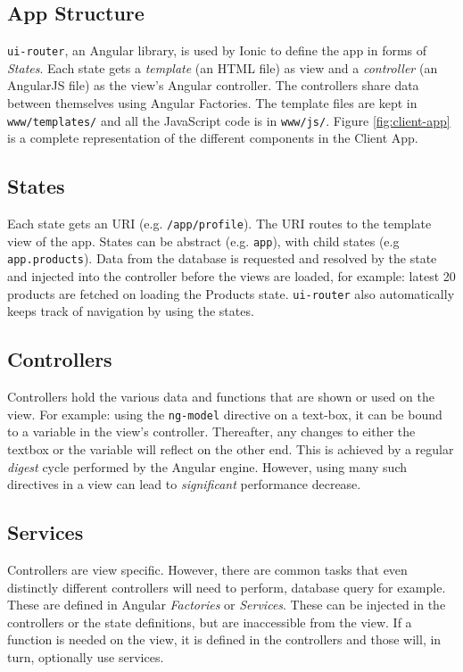 \subsection{App Structure}

\texttt{ui-router}, an Angular library, is used by Ionic to define the app in forms of \textit{States}. Each state gets a \textit{template} (an HTML file) as view and a \textit{controller} (an AngularJS file) as the view's Angular controller. The controllers share data between themselves using Angular Factories. The template files are kept in \texttt{www/templates/} and all the JavaScript code is in \texttt{www/js/}. Figure \ref{fig:client-app} is a complete representation of the different components in the Client App.

\subsection{States}

Each state gets an URI (e.g. \texttt{/app/profile}). The URI routes to the template view of the app. States can be abstract (e.g. \texttt{app}), with child states (e.g \texttt{app.products}). Data from the database is requested and resolved by the state and injected into the controller before the views are loaded, for example: latest 20 products are fetched on loading the Products state. \texttt{ui-router} also automatically keeps track of navigation by using the states.

\subsection{Controllers}

Controllers hold the various data and functions that are shown or used on the view. For example: using the \texttt{ng-model} directive on a text-box, it can be bound to a variable in the view's controller. Thereafter, any changes to either the textbox or the variable will reflect on the other end. This is achieved by a regular \textit{digest} cycle performed by the Angular engine. However, using many such directives in a view can lead to \textit{significant} performance decrease.

\subsection{Services}

Controllers are view specific. However, there are common tasks that even distinctly different controllers will need to perform, database query for example. These are defined in Angular \textit{Factories} or \textit{Services}. These can be injected in the controllers or the state definitions, but are inaccessible from the view. If a function is needed on the view, it is defined in the controllers and those will, in turn, optionally use services.

